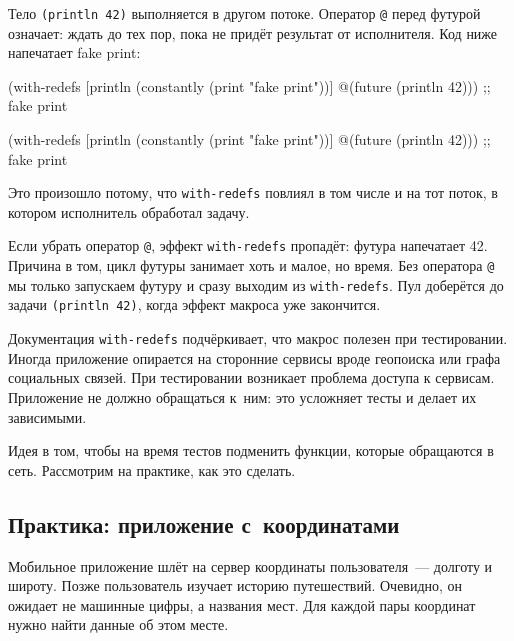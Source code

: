 Тело \verb|(println 42)| выполняется в другом потоке. Оператор \verb|@|
перед футурой означает: ждать до тех пор, пока не придёт результат от
исполнителя. Код ниже напечатает fake print:


\ifx\DEVICETYPE\MOBILE

\begin{english}
  \begin{clojure}
(with-redefs
  [println (constantly
             (print "fake print"))]
  @(future (println 42)))
;; fake print
  \end{clojure}
\end{english}

\else

\begin{english}
  \begin{clojure}
(with-redefs
  [println (constantly (print "fake print"))]
  @(future (println 42)))
;; fake print
  \end{clojure}
\end{english}

\fi

Это произошло потому, что \verb|with-redefs| повлиял в том числе и на тот
поток, в котором исполнитель обработал задачу.

\mnoindent
Если убрать оператор \verb|@|, эффект \verb|with-redefs| пропадёт: футура
напечатает 42. Причина в том, цикл футуры занимает хоть и малое, но время. Без
оператора \verb|@| мы только запускаем футуру и сразу выходим из
\verb|with-redefs|. Пул доберётся до задачи \verb|(println 42)|, когда
эффект макроса уже закончится.

Документация \verb|with-redefs| подчёркивает, что макрос полезен при
тестировании. Иногда приложение опирается на сторонние сервисы вроде геопоиска
или графа социальных связей. При тестировании возникает проблема доступа к
сервисам. Приложение не должно обращаться к~ним: это усложняет тесты и делает их
зависимыми.

Идея в том, чтобы на время тестов подменить функции, которые обращаются в
сеть. Рассмотрим на практике, как это сделать.

\subsection{Практика: приложение с~координатами}


Мобильное приложение шлёт на сервер координаты пользователя~--- долготу и
широту. Позже пользователь изучает историю путешествий. Очевидно, он ожидает не
машинные цифры, а названия мест. Для каждой пары координат нужно найти данные об
этом месте.

